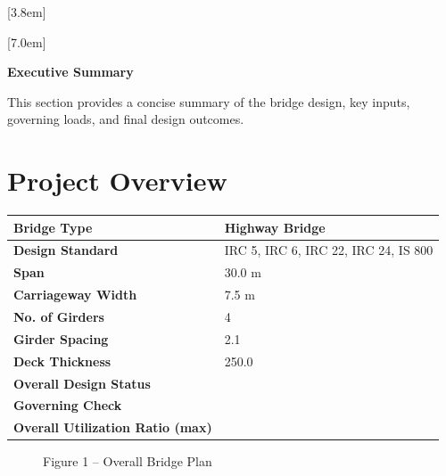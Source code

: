 \documentclass[12pt,a4paper]{report}
\numberwithin{table}{chapter}
\numberwithin{figure}{chapter}
\begin{document}
[3.8em]
  {\normalfont}
  {\contentslabel{2.3em}}
  {\hspace*{-2.3em}}
  {\hfill\contentspage}

[7.0em]
  {\normalfont}
  {\contentslabel{3.2em}}
  {\hspace*{-3.2em}}
  {\hfill\contentspage}

\newpage
\renewcommand{\contentsname}{\centering\Large\bfseries Table of Contents}
\tableofcontents


\newpage
{\centering\Large\bfseries Executive Summary\par}
\vspace{0.8em}

This section provides a concise summary of the bridge design, key inputs, governing loads, and final design outcomes.

\section*{Project Overview}
\label{sec:project-overview}


\begin{tabular}{|L{5.5cm}|L{8.5cm}|}
\hline
\textbf{Bridge Type} & Highway Bridge \\
\hline
\textbf{Design Standard} & IRC 5, IRC 6, IRC 22, IRC 24, IS 800 \\
\hline
\textbf{Span} & 30.0 m \\
\hline
\textbf{Carriageway Width} & 7.5 m \\
\hline
\textbf{No. of Girders} & 4 \\
\hline
\textbf{Girder Spacing} & 2.1 \\
\hline
\textbf{Deck Thickness} & 250.0 \\
\hline
\textbf{Overall Design Status} &  \\
\hline
\textbf{Governing Check} &  \\
\hline
\textbf{Overall Utilization Ratio (max)} &  \\
\hline
\end{tabular}


\begin{figure}[H]
\centering
{}
\caption*{Figure 1 -- Overall Bridge Plan}
\end{figure}

\newpage
\end{document}
